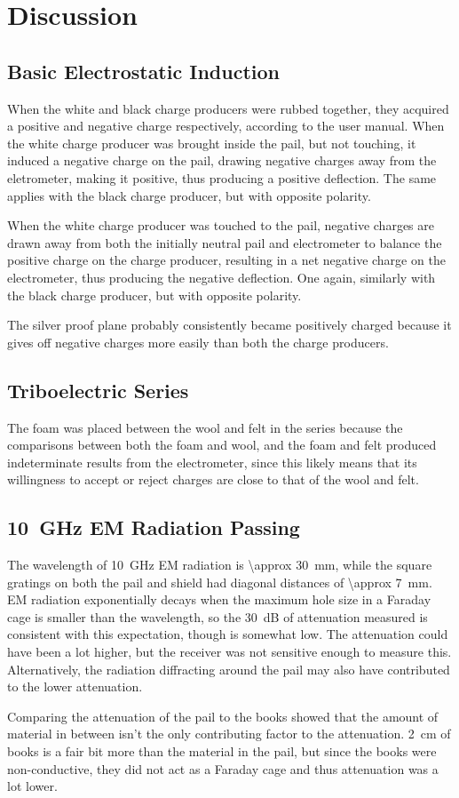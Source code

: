 \documentclass[a4paper]{scrartcl}
\begin{document}
\section{Discussion}
\subsection{Basic Electrostatic Induction}
When the white and black charge producers were rubbed together, they acquired a positive and negative charge respectively, according to the user manual. When the white charge producer was brought inside the pail, but not touching, it induced a negative charge on the pail, drawing negative charges away from the eletrometer, making it positive, thus producing a positive deflection. The same applies with the black charge producer, but with opposite polarity.

When the white charge producer was touched to the pail, negative charges are drawn away from both the initially neutral pail and electrometer to balance the positive charge on the charge producer, resulting in a net negative charge on the electrometer, thus producing the negative deflection. One again, similarly with the black charge producer, but with opposite polarity.

The silver proof plane probably consistently became positively charged because it gives off negative charges more easily than both the charge producers.

\subsection{Triboelectric Series}
The foam was placed between the wool and felt in the series because the comparisons between both the foam and wool, and the foam and felt produced indeterminate results from the electrometer, since this likely means that its willingness to accept or reject charges are close to that of the wool and felt.

\subsection{\SI{10}{\giga\hertz} EM Radiation Passing}
The wavelength of \SI{10}{\giga\hertz} EM radiation is \SI{\approx 30}{\milli\metre}, while the square gratings on both the pail and shield had diagonal distances of \SI{\approx 7}{\milli\metre}. EM radiation exponentially decays when the maximum hole size in a Faraday cage is smaller than the wavelength, so the \SI{30}{\deci\bel} of attenuation measured is consistent with this expectation, though is somewhat low. The attenuation could have been a lot higher, but the receiver was not sensitive enough to measure this. Alternatively, the radiation diffracting around the pail may also have contributed to the lower attenuation.

Comparing the attenuation of the pail to the books showed that the amount of material in between isn't the only contributing factor to the attenuation. \SI{2}{\centi\metre} of books is a fair bit more than the material in the pail, but since the books were non-conductive, they did not act as a Faraday cage and thus attenuation was a lot lower.
\end{document}

